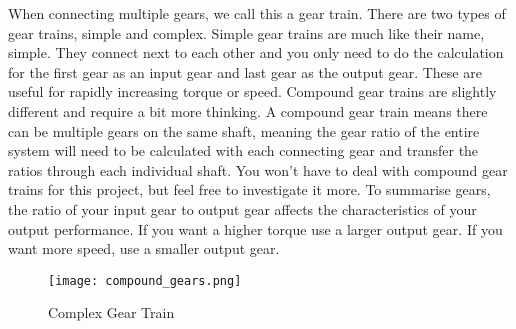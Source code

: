 \documentclass[../TinyBot.tex]{subfiles}
\begin{document}
When connecting multiple gears, we call this a gear train. There are two types of gear trains, simple and complex. Simple gear trains are much like their name, simple. They connect next to each other and you only need to do the calculation for the first gear as an input gear and last gear as the output gear. These are useful for rapidly increasing torque or speed. Compound gear trains are slightly different and require a bit more thinking. A compound gear train means there can be multiple gears on the same shaft, meaning the gear ratio of the entire system will need to be calculated with each connecting gear and transfer the ratios through each individual shaft. You won’t have to deal with compound gear trains for this project, but feel free to investigate it more.
To summarise gears, the ratio of your input gear to output gear affects the characteristics of your output performance. If you want a higher torque use a larger output gear. If you want more speed, use a smaller output gear.

\begin{figure}[h]
    \centering
    \texttt{[image: compound\_gears.png]}
    \label{fig:gear-complex}
    \caption{Complex Gear Train}
\end{figure}
\end{document}
